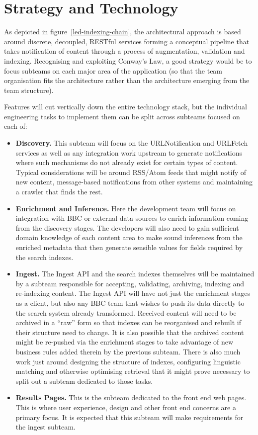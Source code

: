 \section{Strategy and Technology}

As depicted in figure~\ref{led-indexing-chain}, the architectural
approach is based around discrete, decoupled, RESTful services
forming a conceptual pipeline that takes notification of content
through a process of augmentation, validation and indexing. Recognising
and exploiting Conway's Law\cite{conway1968committees}, a good strategy
would be to focus subteams on each major area of the application
(so that the team organisation fits the architecture rather than the
architecture emerging from the team structure).

Features will cut vertically down the entire technology stack, but
the individual engineering tasks to implement them can be split
across subteams focused on each of:

\begin{itemize}
  \item \textbf{Discovery.} This subteam will focus on the URLNotification
    and URLFetch services as well as any integration work upstream to
    generate notifications where such mechanisms do not already exist for certain
    types of content. Typical considerations will be around RSS/Atom feeds that
    might notify of new content, message-based notifications from other
    systems and maintaining a crawler that finds the rest.
  \item \textbf{Enrichment and Inference.} Here the development team will focus
    on integration with BBC or external data sources to enrich information
    coming from the discovery stages. The developers will also need
    to gain sufficient domain knowledge of each content area to make sound
    inferences from the enriched metadata that then generate sensible
    values for fields required by the search indexes.
  \item \textbf{Ingest.} The Ingest API and the search indexes themselves
    will be maintained by a subteam responsible for accepting, validating,
    archiving, indexing and re-indexing content. The Ingest API will have
    not just the enrichment stages as a client, but also any BBC team that
    wishes to push its data directly to the search system already transformed.
    Received content will need to be archived in a ``raw'' form so that
    indexes can be reorganised and rebuilt if their structure need to change. It
    is also possible that the archived content might be re-pushed via the
    enrichment stages to take advantage of new business rules added therein by
    the previous subteam. There is also much work just around designing the
    structure of indexes, configuring linguistic matching and otherwise
    optimising retrieval that it might prove necessary to split out a subteam
    dedicated to those tasks.
  \item \textbf{Results Pages.} This is the subteam dedicated to the front
    end web pages. This is where user experience, design and other front
    end concerns are a primary focus. It is expected that this subteam
    will make requirements for the ingest subteam.
\end{itemize}

